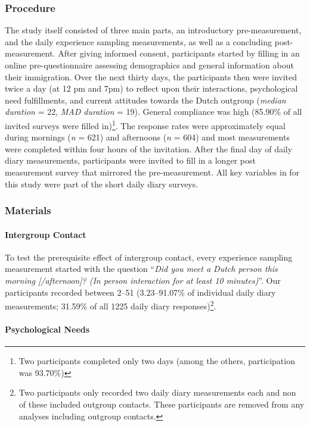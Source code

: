 \subsubsection{Procedure}

The study itself consisted of three main parts, an introductory
pre-measurement, and the daily experience sampling measurements, as well
as a concluding post-measurement. After giving informed consent,
participants started by filling in an online pre-questionnaire assessing
demographics and general information about their immigration. Over the
next thirty days, the participants then were invited twice a day (at 12
pm and 7pm) to reflect upon their interactions, psychological need
fulfillments, and current attitudes towards the Dutch outgroup
(\textit{median duration} = 22, \textit{MAD duration} = 19). General
compliance was high (85.90\% of all invited surveys were filled
in)\footnote{Two participants completed only two days (among the others, participation was 93.70\%)}.
The response rates were approximately equal during mornings (\textit{n}
= 621) and afternoons (\textit{n} = 604) and most measurements were
completed within four hours of the invitation. After the final day of
daily diary measurements, participants were invited to fill in a longer
post measurement survey that mirrored the pre-measurement. All key
variables in for this study were part of the short daily diary surveys.

\subsubsection{Materials}

\paragraph{Intergroup Contact}

To test the prerequisite effect of intergroup contact, every experience
sampling measurement started with the question
``\textit{Did you meet a Dutch person this morning [/afternoon]? (In person interaction for at least 10 minutes)}''.
Our participants recorded between 2--51 (3.23--91.07\% of individual
daily diary measurements; 31.59\% of all 1225 daily diary
responses)\footnote{Two participants only recorded two daily diary measurements each and non of these included outgroup contacts. These participants are removed from any analyses including outgroup contacts.}.

\paragraph{Psychological Needs}

